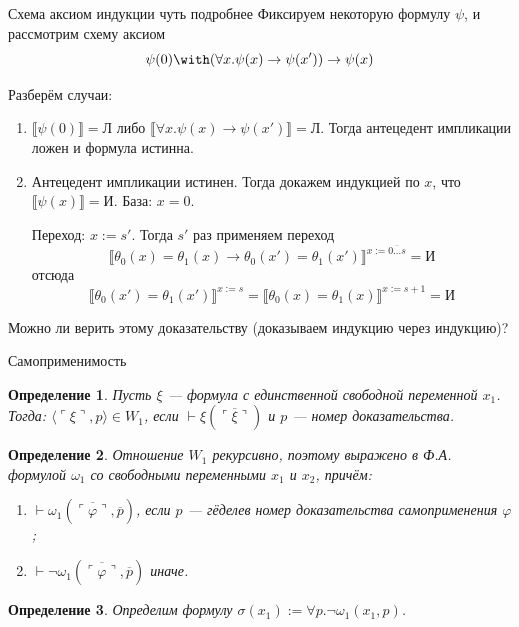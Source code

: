 \documentclass[aspectratio=169]{beamer}
\newtheorem{dfn}{Определение}[section]
\begin{document}
\begin{frame}{Схема аксиом индукции чуть подробнее}
Фиксируем некоторую формулу $\psi$, 
и рассмотрим схему аксиом $$\psi(0) \with (\forall x.\psi(x) \rightarrow \psi(x')) \rightarrow \psi(x)$$

Разберём случаи:
\begin{enumerate}
\item $\llbracket\psi(0)\rrbracket = \text{Л}$ либо 
$\llbracket\forall x.\psi(x) \rightarrow \psi(x')\rrbracket = \text{Л}$. Тогда антецедент импликации ложен 
и формула истинна.
\item Антецедент импликации истинен. Тогда докажем индукцией по $x$, что $\llbracket \psi(x) \rrbracket = \text{И}$.
База:
$x = 0$.

Переход: $x := s'$. Тогда $s'$ раз применяем переход $$\llbracket \theta_0(x) = \theta_1(x) \rightarrow \theta_0(x') = \theta_1(x') \rrbracket^{x := \overline{0\dots s}} = \text{И}$$
отсюда $$\llbracket\theta_0(x') = \theta_1(x') \rrbracket^{x := s} = \llbracket\theta_0(x) = \theta_1(x) \rrbracket^{x := s+1} = \text{И}$$
\end{enumerate}

\pause
Можно ли верить этому доказательству (доказываем индукцию через индукцию)?
\end{frame}

\begin{frame}{Самоприменимость}
\begin{dfn}Пусть $\xi$ --- формула с единственной свободной
переменной $x_1$. Тогда:
$\langle\ulcorner \xi \urcorner,p\rangle \in W_1$, если $\vdash \xi(\overline{\ulcorner \xi \urcorner})$ и $p$ --- номер доказательства.
\end{dfn}

\begin{dfn}Отношение $W_1$ рекурсивно, поэтому выражено в Ф.А. формулой $\omega_1$ со свободными переменными $x_1$ и $x_2$, причём:
\begin{enumerate}
\item $\vdash \omega_1(\overline{\ulcorner \varphi \urcorner},\overline{p})$, если $p$ --- гёделев номер
доказательства самоприменения $\varphi$;
\item $\vdash \neg\omega_1(\overline{\ulcorner \varphi \urcorner},\overline{p})$ иначе.
\end{enumerate}
\end{dfn}

\begin{dfn}
Определим формулу $\sigma(x_1) := \forall p.\neg\omega_1(x_1,p)$. 
\end{dfn}
\end{frame}
\end{document}
